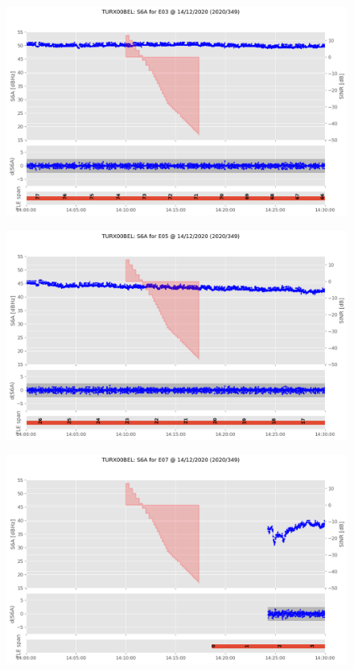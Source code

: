 \begin{enumerate}
%


\begin{figure}[H]%
\centering%
\includegraphics[width=0.95\linewidth]{png/TURX00BEL_R_20203491400_30M_01S_MO_E-S6A-E03.png}%
\end{figure}

%


\begin{figure}[H]%
\centering%
\includegraphics[width=0.95\linewidth]{png/TURX00BEL_R_20203491400_30M_01S_MO_E-S6A-E05.png}%
\end{figure}

%


\begin{figure}[H]%
\centering%
\includegraphics[width=0.95\linewidth]{png/TURX00BEL_R_20203491400_30M_01S_MO_E-S6A-E07.png}%
\end{figure}


\end{enumerate}
